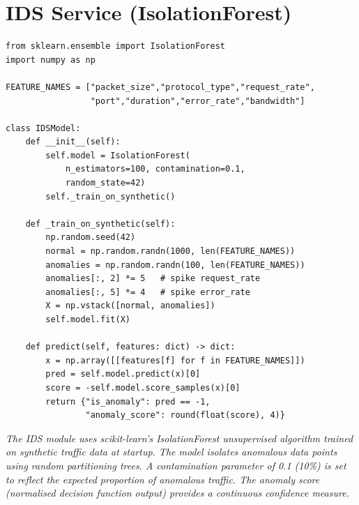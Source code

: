 \section{IDS Service (IsolationForest)}
\begin{verbatim}
from sklearn.ensemble import IsolationForest
import numpy as np

FEATURE_NAMES = ["packet_size","protocol_type","request_rate",
                 "port","duration","error_rate","bandwidth"]

class IDSModel:
    def __init__(self):
        self.model = IsolationForest(
            n_estimators=100, contamination=0.1,
            random_state=42)
        self._train_on_synthetic()

    def _train_on_synthetic(self):
        np.random.seed(42)
        normal = np.random.randn(1000, len(FEATURE_NAMES))
        anomalies = np.random.randn(100, len(FEATURE_NAMES))
        anomalies[:, 2] *= 5   # spike request_rate
        anomalies[:, 5] *= 4   # spike error_rate
        X = np.vstack([normal, anomalies])
        self.model.fit(X)

    def predict(self, features: dict) -> dict:
        x = np.array([[features[f] for f in FEATURE_NAMES]])
        pred = self.model.predict(x)[0]
        score = -self.model.score_samples(x)[0]
        return {"is_anomaly": pred == -1,
                "anomaly_score": round(float(score), 4)}
\end{verbatim}
\textit{The IDS module uses scikit-learn's IsolationForest unsupervised algorithm trained on synthetic traffic data at startup. The model isolates anomalous data points using random partitioning trees. A contamination parameter of 0.1 (10\%) is set to reflect the expected proportion of anomalous traffic. The anomaly score (normalised decision function output) provides a continuous confidence measure.}


